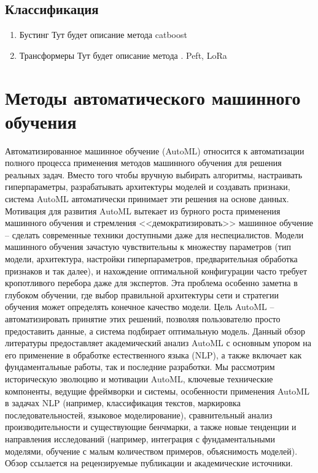 \documentclass[14pt,a4paper,oneside,openany]{book}
\begin{document}
\subsection{Классификация}
\label{sec:org4694102}
\begin{enumerate}
\item Бустинг
\label{sec:org3b7c0fa}
Тут будет описание метода catboost \autocite{dorogush_catboost_2018,prokhorenkova_catboost_2018}
\item Трансформеры
\label{sec:orgdb31345}
Тут будет описание метода \autocite{reimers_sentencebert_2019,devlin_bert_2019,vaswani_attention_2017}. Peft\autocite{han_parameterefficient_2024}, LoRa\autocite{hu_lora_2021}
\end{enumerate}
\section{Методы автоматического машинного обучения}
\label{sec:org3e28c3d}
Автоматизированное машинное обучение (AutoML) относится к автоматизации полного процесса применения методов машинного обучения для решения реальных задач. Вместо того чтобы вручную выбирать алгоритмы, настраивать гиперпараметры, разрабатывать архитектуры моделей и создавать признаки, система AutoML автоматически принимает эти решения на основе данных. Мотивация для развития AutoML вытекает из бурного роста применения машинного обучения и стремления {}<<демократизировать>>{} машинное обучение – сделать современные техники доступными даже для неспециалистов. Модели машинного обучения зачастую чувствительны к множеству параметров (тип модели, архитектура, настройки гиперпараметров, предварительная обработка признаков и так далее), и нахождение оптимальной конфигурации часто требует кропотливого перебора даже для экспертов. Эта проблема особенно заметна в глубоком обучении, где выбор правильной архитектуры сети и стратегии обучения может определять конечное качество модели. Цель AutoML – автоматизировать принятие этих решений, позволяя пользователю просто предоставить данные, а система подбирает оптимальную модель. Данный обзор литературы предоставляет академический анализ AutoML с основным упором на его применение в обработке естественного языка (NLP), а также включает как фундаментальные работы, так и последние разработки. Мы рассмотрим историческую эволюцию и мотивации AutoML, ключевые технические компоненты, ведущие фреймворки и системы, особенности применения AutoML в задачах NLP (например, классификация текстов, маркировка последовательностей, языковое моделирование), сравнительный анализ производительности и существующие бенчмарки, а также новые тенденции и направления исследований (например, интеграция с фундаментальными моделями, обучение с малым количеством примеров, объяснимость моделей). Обзор ссылается на рецензируемые публикации и академические источники.
\end{document}
